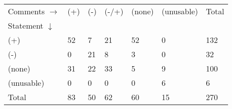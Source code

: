 \begin{tabular}{lllllll}
\hline
Comments $\rightarrow$ & (+) & (-) & (-/+) & (none) &(unusable) & Total \\
Statement $\downarrow$ & &&&&& \\
\hline
(+) & 52 & 7 & 21 & 52 & 0& 132\\
(-) & 0 & 21 & 8 & 3 & 0& 32\\
(none) & 31 & 22 & 33 & 5 & 9& 100\\
(unusable) & 0 & 0 & 0 & 0 & 6& 6\\
Total & 83 & 50 & 62 & 60 & 15& 270\\
\hline
\end{tabular}
